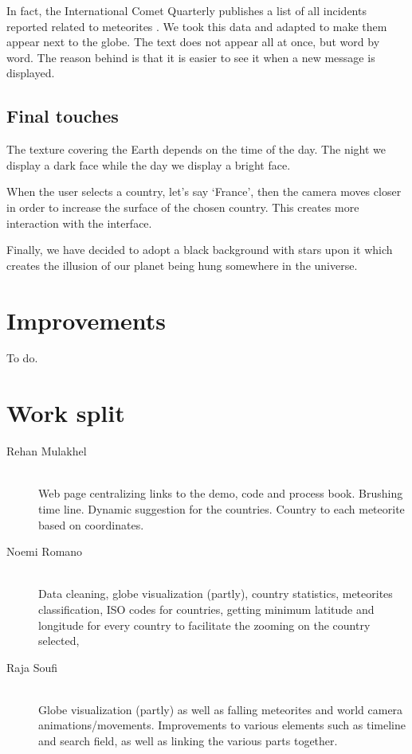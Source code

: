 \documentclass[10pt,conference,compsocconf]{IEEEtran}
\begin{document}
In fact, the International Comet Quarterly publishes a list of all incidents reported related to meteorites \cite{international_comet_quarterly}. We took this data and adapted to make them appear next to the globe. The text does not appear all at once, but word by word. The reason behind is that it is easier to see it when a new message is displayed.



\subsection{Final touches}

The texture covering the Earth depends on the time of the day. The night we display a dark face while the day we display a bright face.

When the user selects a country, let's say `France', then the camera moves closer in order to increase the surface of the chosen country. This creates more interaction with the interface.

Finally, we have decided to adopt a black background with stars upon it which creates the illusion of our planet being hung somewhere in the universe.




\section{Improvements}
\label{sec:improvements}

To do.

\section{Work split}
\label{sec:work_split}

\begin{description}
\item[Rehan Mulakhel] \ \\
  Web page centralizing links to the demo, code and process book. Brushing time line. Dynamic suggestion for the countries. Country to each meteorite based on coordinates. 
\item[Noemi Romano] \ \\
  Data cleaning, globe visualization (partly), country statistics, meteorites classification, ISO codes for countries, getting minimum latitude and longitude for every country to facilitate the zooming on the country selected,  
\item[Raja Soufi] \ \\
  Globe visualization (partly) as well as falling meteorites and world camera animations/movements.
  Improvements to various elements such as timeline and search field, as well as linking the various parts together.
\end{description}






\end{document}
